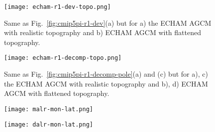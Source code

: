 \documentclass{ametsocV5}
\begin{document}
\begin{figure}[t]
  \noindent\texttt{[image: echam-r1-dev-topo.png]}\\
  \caption{Same as Fig.~\ref{fig:cmip5pi-r1-dev}(a) but for a) the ECHAM AGCM with realistic topography and b) ECHAM AGCM with flattened topography.}
  \label{fig:echam-r1-dev-topo}
\end{figure}

\begin{figure}[t]
  \noindent\texttt{[image: echam-r1-decomp-topo.png]}\\
  \caption{Same as Fig.~\ref{fig:cmip5pi-r1-decomp-pole}(a) and (c) but for a), c) the ECHAM AGCM with realistic topography and b), d) ECHAM AGCM with flattened topography.}
  \label{fig:echam-r1-decomp-topo}
\end{figure}

\begin{figure}[t]
  \noindent\texttt{[image: malr-mon-lat.png]}\\
  \label{fig:malr-mon-lat}
\end{figure}

\begin{figure}[t]
  \noindent\texttt{[image: dalr-mon-lat.png]}\\
  \label{fig:dalr-mon-lat}
\end{figure}
\end{document}
